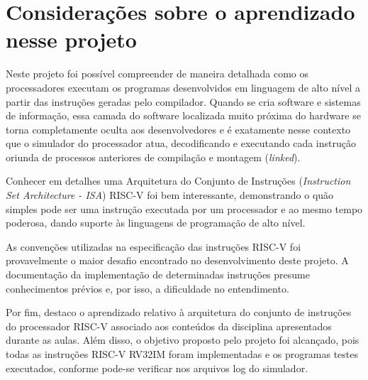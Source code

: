 
\section{Considerações sobre o aprendizado nesse projeto}

Neste projeto foi possível compreender de maneira detalhada como os processadores executam os programas desenvolvidos em linguagem de alto nível a partir das instruções geradas pelo compilador. Quando se cria software e sistemas de informação, essa camada do software localizada muito próxima do hardware se torna completamente oculta aos desenvolvedores e é exatamente nesse contexto que o simulador do processador atua, decodificando e executando cada instrução oriunda de processos anteriores de compilação e montagem (\textit{linked}).

Conhecer em detalhes uma Arquitetura do Conjunto de Instruções (\textit{Instruction Set Architecture - ISA}) RISC-V foi bem interessante, demonstrando o quão simples pode ser uma instrução executada por um processador e ao mesmo tempo poderosa, dando suporte às linguagens de programação de alto nível.

As convenções utilizadas na especificação das instruções RISC-V foi provavelmente o maior desafio encontrado no desenvolvimento deste projeto. A documentação da implementação de determinadas instruções presume conhecimentos prévios e, por isso, a dificuldade no entendimento.

Por fim, destaco o aprendizado relativo à arquitetura do conjunto de instruções do processador RISC-V associado aos conteúdos da disciplina apresentados durante as aulas. Além disso, o objetivo proposto pelo projeto foi alcançado, pois todas as instruções RISC-V RV32IM foram implementadas e os programas testes executados, conforme pode-se verificar nos arquivos log do simulador.